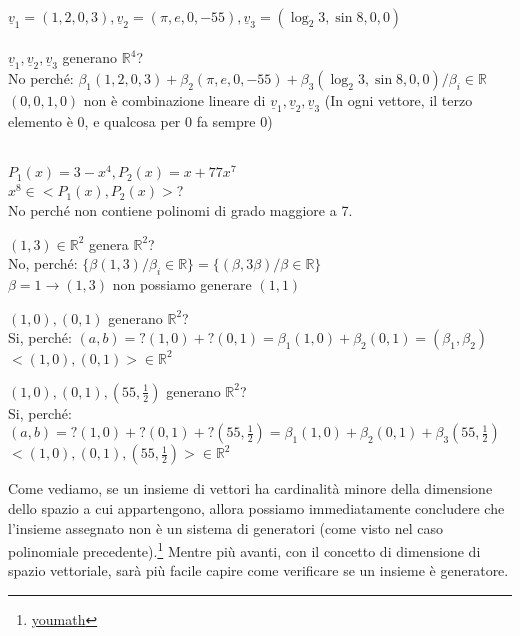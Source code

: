 \begin{es}
	\phantom{}\\
	$\underline{v}_1=(1,2,0,3), \underline{v}_2=(\pi,e,0,-55), \underline{v}_3=(\log_2 3,\sin 8,0,0)$\\\\
	$\underline{v}_1, \underline{v}_2, \underline{v}_3$ generano $\mathbb{R}^4$?\\
	No perché: $\beta_1(1,2,0,3)+\beta_2(\pi,e,0,-55)+\beta_3(\log_2 3,\sin 8,0,0)/\beta_i\in\mathbb{R}$\\
	$(0,0,1,0)$ non è combinazione lineare di $\underline{v}_1,\underline{v}_2,\underline{v}_3$ (In ogni vettore, il terzo elemento è 0, e qualcosa per 0 fa sempre 0)\\\\
\end{es}
\begin{es}
	$P_1(x)=3-x^4, P_2(x)=x+77x^7$\\
	$x^8\in<P_1(x), P_2(x)>$?\\
	No perché non contiene polinomi di grado maggiore a 7.
\end{es}
\begin{es}
	$(1,3)\in\mathbb{R}^2$ genera $\mathbb{R}^2$?\\
	No, perché: $\{\beta(1,3)/\beta_i\in\mathbb{R}\}=\{(\beta,3\beta)/\beta\in\mathbb{R}\}$\\
	$\beta=1\rightarrow(1,3)$ non possiamo generare $(1,1)$
\end{es}
\begin{es}
	$(1,0),(0,1)$ generano $\mathbb{R}^2$?\\
	Si, perché: $(a,b)=?(1,0)+?(0,1)=\beta_1(1,0)+\beta_2(0,1)=(\beta_1,\beta_2)$\\
	$<(1,0),(0,1)>\in\mathbb{R}^2$
\end{es}
\begin{es}
	$(1,0),(0,1),(55,\frac{1}{2})$ generano $\mathbb{R}^2$?\\
	Si, perché: $(a,b)=?(1,0)+?(0,1)+?(55,\frac{1}{2})=\beta_1(1,0)+\beta_2(0,1)+\beta_3(55,\frac{1}{2})$\\
	$<(1,0),(0,1),(55,\frac{1}{2})>\in\mathbb{R}^2$
\end{es}

Come vediamo, se un insieme di vettori ha cardinalità minore della dimensione dello spazio a cui appartengono, allora possiamo immediatamente concludere che l'insieme assegnato non è un sistema di generatori (come visto nel caso polinomiale precedente).\footnote{\href{https://www.youmath.it/lezioni/algebra-lineare/matrici-e-vettori/678-sistema-di-generatori-di-uno-spazio-vettoriale.html}{youmath}} Mentre più avanti, con il concetto di dimensione di spazio vettoriale, sarà più facile capire come verificare se un insieme è generatore.


